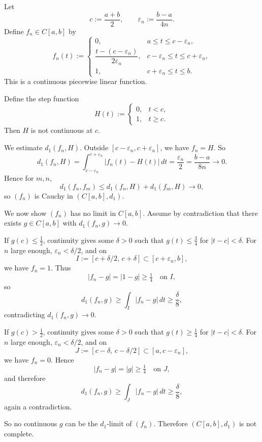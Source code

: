 \documentclass{article}
\begin{document}
\begin{solution}
  Let
  \[
    c:=\frac{a+b}{2}, \qquad \varepsilon_n:=\frac{b-a}{4n}.
  \]
  Define $f_n\in C[a,b]$ by
  \[
    f_n(t):=
    \begin{cases}
      0, & a\le t\le c-\varepsilon_n, \\
      \dfrac{t-(c-\varepsilon_n)}{2\varepsilon_n},
      & c-\varepsilon_n\le t\le c+\varepsilon_n, \\
      1, & c+\varepsilon_n\le t\le b.
    \end{cases}
  \]
  This is a continuous piecewise linear function.

  Define the step function
  \[
    H(t):=
    \begin{cases}
      0, & t<c, \\
      1, & t\ge c.
    \end{cases}
  \]
  Then $H$ is not continuous at $c$.

  We estimate $d_1(f_n,H)$. Outside $[c-\varepsilon_n,c+\varepsilon_n]$,
  we have $f_n=H$. So
  \[
    d_1(f_n,H)
    =\int_{c-\varepsilon_n}^{c+\varepsilon_n}|f_n(t)-H(t)|\,dt
    =\frac{\varepsilon_n}{2}
    =\frac{b-a}{8n}\to 0.
  \]
  Hence for $m,n$,
  \[
    d_1(f_n,f_m)\le d_1(f_n,H)+d_1(f_m,H)\to 0,
  \]
  so $(f_n)$ is Cauchy in $(C[a,b],d_1)$.

  We now show $(f_n)$ has no limit in $C[a,b]$. Assume by contradiction
  that there exists $g\in C[a,b]$ with $d_1(f_n,g)\to 0$.

  If $g(c)\le \tfrac12$, continuity gives some $\delta>0$ such that
  $g(t)\le \tfrac34$ for $|t-c|<\delta$. For $n$ large enough,
  $\varepsilon_n<\delta/2$, and on
  \[
    I:=[c+\delta/2,\,c+\delta]\subset[c+\varepsilon_n,b],
  \]
  we have $f_n=1$. Thus
  \[
    |f_n-g|=|1-g|\ge \tfrac14 \quad \text{on } I,
  \]
  so
  \[
    d_1(f_n,g)\ge \int_I |f_n-g|\,dt\ge \frac{\delta}{8},
  \]
  contradicting $d_1(f_n,g)\to 0$.

  If $g(c)>\tfrac12$, continuity gives some $\delta>0$ such that
  $g(t)\ge \tfrac14$ for $|t-c|<\delta$. For $n$ large enough,
  $\varepsilon_n<\delta/2$, and on
  \[
    J:=[c-\delta,\,c-\delta/2]\subset[a,c-\varepsilon_n],
  \]
  we have $f_n=0$. Hence
  \[
    |f_n-g|=|g|\ge \tfrac14 \quad \text{on } J,
  \]
  and therefore
  \[
    d_1(f_n,g)\ge \int_J |f_n-g|\,dt\ge \frac{\delta}{8},
  \]
  again a contradiction.

  So no continuous $g$ can be the $d_1$-limit of $(f_n)$. Therefore
  $(C[a,b],d_1)$ is not complete.
\end{solution}
\end{document}
